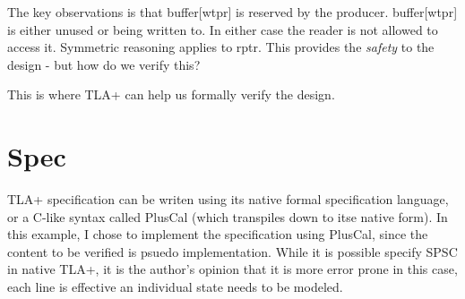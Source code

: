\documentclass{report}
\begin{document}
The key observations is that buffer[wtpr] is reserved by the producer.
buffer[wtpr] is either unused or being written to. In either case the reader is
not allowed to access it. Symmetric reasoning applies to rptr. This provides
the \textit{safety} to the design - but how do we verify this?\newline

This is where TLA+ can help us formally verify the design.

\section{Spec}

TLA+ specification can be writen using its native formal specification
language, or a C-like syntax called PlusCal (which transpiles down to itse
native form). In this example, I chose to implement the specification using
PlusCal, since the content to be verified is psuedo implementation. While it is
possible specify SPSC in native TLA+, it is the author's opinion that it is
more error prone in this case, each line is effective an individual state needs
to be modeled.\newline
\end{document}
